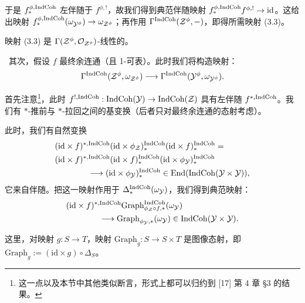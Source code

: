 于是 $f^{\phi,\mathrm{IndCoh}}_*$ 左伴随于 $f^{\phi,!}$，故我们得到典范伴随映射 $f^{\phi,\mathrm{IndCoh}}_* f^{\phi,!} \to \mathrm{id}$。这给出映射 $f^{\phi,\mathrm{IndCoh}}_*(\omega_{\mathcal{Y}^\phi}) \to \omega_{\mathcal{Z}^\phi}$；再作用 $\Gamma^{\mathrm{IndCoh}}(\mathcal{Z}^\phi, -)$，即得所需映射 (3.3)。

\begin{remark}
映射 (3.3) 是 $\Gamma(\mathcal{Z}^\phi, \mathcal{O}_{\mathcal{Z}^\phi})$-线性的。
\end{remark}

\ 其次，假设 $f$ 最终余连通（且 1-可表）。此时我们将构造映射：
\begin{equation}
  \Gamma^{\mathrm{IndCoh}}(\mathcal{Z}^\phi, \omega_{\mathcal{Z}^\phi}) \longrightarrow
  \Gamma^{\mathrm{IndCoh}}(\mathcal{Y}^\phi, \omega_{\mathcal{Y}^\phi}).
\end{equation}

首先注意\footnote{这一点以及本节中其他类似断言，形式上都可以归约到 [17] 第 4 章 §3 的结果。}，此时 $f^{!,\mathrm{IndCoh}} : \mathrm{IndCoh}(\mathcal{Y}) \to \mathrm{IndCoh}(\mathcal{Z})$ 具有左伴随 $f^{*,\mathrm{IndCoh}}$。我们有 $*$-推前与 $*$-拉回之间的基变换（后者只对最终余连通的态射考虑）。

此时，我们有自然变换
\[
  \begin{aligned}
    &(\mathrm{id} \times f)^{*,\mathrm{IndCoh}}(\mathrm{id} \times \phi_{\mathcal{Z}})^{\mathrm{IndCoh}}_*
      (\mathrm{id} \times f)^{\mathrm{IndCoh}}_* = {}\\
    &(\mathrm{id} \times f)^{*,\mathrm{IndCoh}}(\mathrm{id} \times f)^{\mathrm{IndCoh}}_*
      (\mathrm{id} \times \phi_{\mathcal{Y}})^{\mathrm{IndCoh}}_*\\
    &\qquad\qquad \longrightarrow (\mathrm{id} \times \phi_{\mathcal{Y}})^{\mathrm{IndCoh}}_*
      \in \mathrm{End}(\mathrm{IndCoh}(\mathcal{Y} \times \mathcal{Y})),
  \end{aligned}
\]
它来自伴随。把这一映射作用于 $\Delta^{\mathrm{IndCoh}}_*(\omega_{\mathcal{Y}})$，我们得到典范映射：
\begin{equation}
  \begin{aligned}
    &(\mathrm{id} \times f)^{*,\mathrm{IndCoh}}
      \mathrm{Graph}^{\mathrm{IndCoh}}_{\phi_{\mathcal{Z}} \circ f,*}(\omega_{\mathcal{Y}})\\
    &\qquad\qquad \longrightarrow \mathrm{Graph}_{\phi_{\mathcal{Y}},*}(\omega_{\mathcal{Y}})
      \in \mathrm{IndCoh}(\mathcal{Y} \times \mathcal{Y}).
  \end{aligned}
\end{equation}

这里，对映射 $g : S \to T$，映射 $\mathrm{Graph}_g : S \to S \times T$ 是图像态射，即 $\mathrm{Graph}_g := (\mathrm{id} \times g) \circ \Delta_S$。

